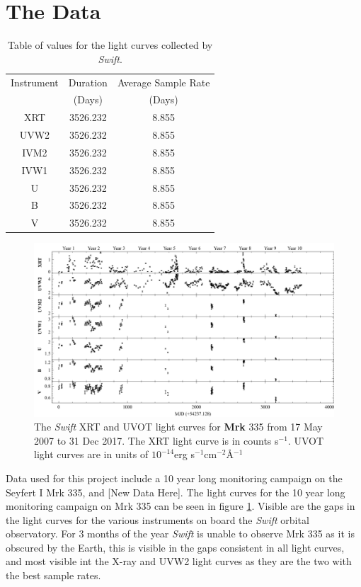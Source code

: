 \documentclass[12pt, oneside]{smuthesis}
\begin{document}
\section{\sc The Data} \label{theData}

\setlength{\tabcolsep}{18pt}
\renewcommand{\arraystretch}{1.5}

\begin{table}[b!]
	\centering
	\begin{tabular}{ c c c }
		\hline\hline
		Instrument & Duration & Average Sample Rate \\
		& (Days) & (Days) \\
		\hline
		XRT & 3526.232 & 8.855  \\
		UVW2 & 3526.232 & 8.855 \\
		IVM2 & 3526.232 & 8.855 \\
		IVW1 & 3526.232 & 8.855 \\
		U & 3526.232 & 8.855 \\
		B & 3526.232 & 8.855 \\
		V & 3526.232 & 8.855 \\
		\hline
	\end{tabular}
	\caption{Table of values for the light curves collected by \textit{Swift}.}
\end{table}

\begin{figure}
	\centering
	\includegraphics[width=0.8\linewidth]{mkn335Lightcurves}
	\caption{The \textit{Swift} XRT and UVOT light curves for \textbf{Mrk} 335 from 17 May 2007 to 31 Dec 2017. The XRT light curve is in counts s$^{-1}$. UVOT light curves are in units of $10^{-14}$erg s$^{-1}$cm$^{-2}$\AA$^{-1}$}
	\label{fig:mkn335LC}
\end{figure}

Data used for this project include a 10 year long monitoring campaign on the Seyfert I Mrk 335, and [New Data Here]. The light curves for the 10 year long monitoring campaign on Mrk 335 can be seen in figure \ref{fig:mkn335LC}. Visible are the gaps in the light curves for the various instruments on board the \textit{Swift} orbital observatory. For 3 months of the year \textit{Swift} is unable to observe Mrk 335 as it is obscured by the Earth, this is visible in the gaps consistent in all light curves, and most visible int the X-ray and UVW2 light curves as they are the two with the best sample rates.
\end{document}
